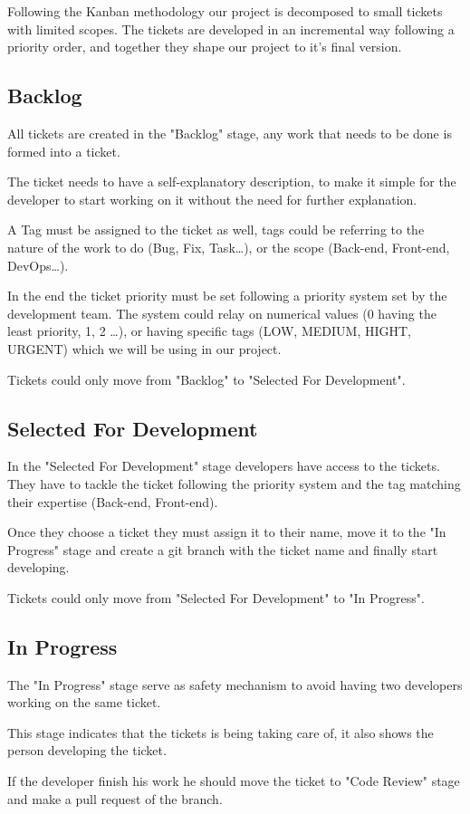 \begin{spacing}{1.2}
Following the Kanban methodology our project is decomposed to small tickets with limited scopes. The tickets are developed in an incremental way following a priority order, and together they shape our project to it's final version.
\subsection{Backlog}
All tickets are created in the "Backlog" stage, any work that needs to be done is formed into a ticket.


The ticket needs to have a self-explanatory description, to make it simple for the developer to start working on it without the need for further explanation.

A Tag must be assigned to the ticket as well, tags could be referring to the nature of the work to do (Bug, Fix, Task\dots), or the scope (Back-end, Front-end, DevOps\dots).

In the end the ticket priority must be set following a priority system set by the development team. The system could relay on numerical values (0 having the least priority, 1, 2 \dots), or having specific tags (LOW, MEDIUM, HIGHT, URGENT) which we will be using in our project.

Tickets could only move from "Backlog" to "Selected For Development".
\subsection{Selected For Development}
In the "Selected For Development" stage developers have access to the tickets. They have to tackle the ticket following the priority system and the tag matching their expertise (Back-end, Front-end).

Once they choose a ticket they must assign it to their name, move it to the "In Progress" stage and create a git branch with the ticket name and finally start developing.

Tickets could only move from "Selected For Development" to "In Progress".
\subsection{In Progress}
The "In Progress" stage serve as safety mechanism to avoid having two developers working on the same ticket.

This stage indicates that the tickets is being taking care of, it also shows the person developing the ticket.

If the developer finish his work he should move the ticket to "Code Review" stage and make a pull request of the branch.



\end{spacing}
